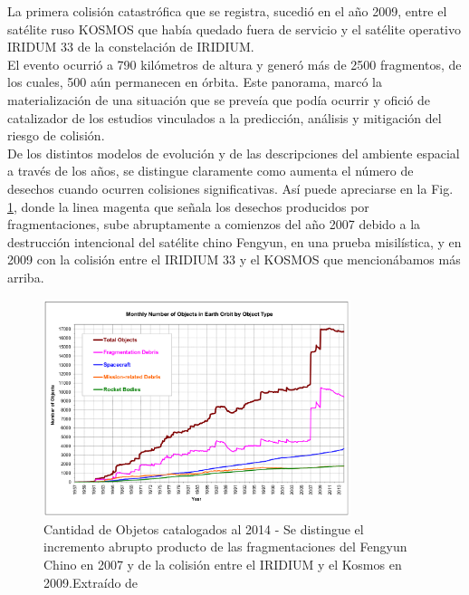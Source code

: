 La primera colisi\'on catastr\'ofica que se registra, sucedi\'o en el a\~no 2009, entre el sat\'elite ruso KOSMOS  que hab\'ia quedado fuera de servicio y el sat\'elite operativo IRIDUM 33 de la constelaci\'on de IRIDIUM.\\

El evento ocurri\'o a 790 kil\'ometros de altura y gener\'o m\'as de 2500 fragmentos, de los cuales, 500 a\'un permanecen en \'orbita. Este panorama, marc\'o la materializaci\'on de una situaci\'on que se preve\'ia que pod\'ia ocurrir y ofici\'o de catalizador de los estudios vinculados a la predicci\'on, an\'alisis y mitigaci\'on del riesgo de colisi\'on.\\

De los distintos modelos de evoluci\'on y de las descripciones del ambiente espacial a trav\'es de los a\~nos, se distingue claramente como aumenta el n\'umero de desechos cuando ocurren colisiones significativas. As\'i puede apreciarse en la Fig. \ref{fig:cantidad2014}, donde la linea magenta que se\~nala los desechos producidos por fragmentaciones, sube abruptamente a comienzos del a\~no 2007 debido a la destrucci\'on intencional del sat\'elite chino Fengyun, en una prueba misil\'istica, y en 2009 con la colisi\'on entre el IRIDIUM 33 y el KOSMOS que mencion\'abamos m\'as arriba.\\

\begin{figure}[!h]
  \centering
  \includegraphics[width=0.8\textwidth]{imagenes/numero2014}
  \caption[Cantidad de Objetos catalogados al 2014]{Cantidad de Objetos catalogados al 2014 - Se distingue el incremento abrupto producto de las fragmentaciones del Fengyun Chino en 2007 y de la colisi\'on entre el IRIDIUM y el Kosmos en 2009.Extra\'ido de \citep{ODQN14}}
  \label{fig:cantidad2014}
\end{figure}

